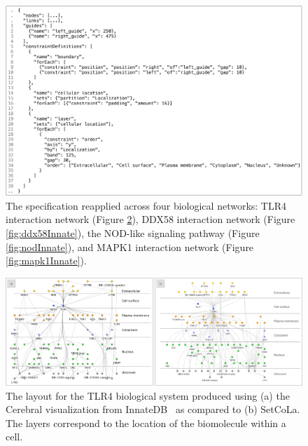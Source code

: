 \documentclass{egpubl}
\begin{document}
\begin{figure}[t]
  \centering
  \includegraphics[width=\columnwidth]{figures/innatedb-specification.pdf}
  \vspace{-11px} {\caption{\label{fig:specification} 
    The specification reapplied across four biological networks: 
    TLR4 interaction network (Figure \ref{fig:tlr4Innate}),
    DDX58 interaction network (Figure \ref{fig:ddx58Innate}),
    the NOD-like signaling pathway (Figure \ref{fig:nodInnate}),
    and MAPK1 interaction network (Figure \ref{fig:mapk1Innate}).
  }}
\end{figure}

\begin{figure}[t]
  \centering
  \includegraphics[width=\textwidth]{figures/innatedb-tlr4.pdf}
  \vspace{-15px} {\caption{\label{fig:tlr4Innate} 
    The layout for the TLR4 biological system produced using 
    (a) the Cerebral visualization from InnateDB~\cite{innatedb:tlr4}
    as compared to (b) SetCoLa. The layers correspond to the 
    location of the biomolecule within a cell.
  }}
  \vspace{-10px}
\end{figure}
\end{document}

